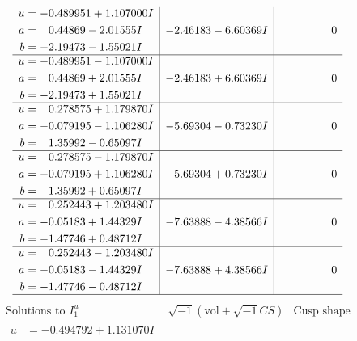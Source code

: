 \documentclass[1p]{elsarticle_modified}
\theoremstyle{definition}
\newcommand{\I}{\sqrt{-1}}
\begin{document}
$$\begin{array}{c|c|c}
\begin{aligned}
u &= -0.489951 + 1.107000 I \\
a &= \phantom{-}0.44869 - 2.01555 I \\
b &= -2.19473 - 1.55021 I\end{aligned}
 & -2.46183 - 6.60369 I & \phantom{-0.000000 } 0 \\ \hline\begin{aligned}
u &= -0.489951 - 1.107000 I \\
a &= \phantom{-}0.44869 + 2.01555 I \\
b &= -2.19473 + 1.55021 I\end{aligned}
 & -2.46183 + 6.60369 I & \phantom{-0.000000 } 0 \\ \hline\begin{aligned}
u &= \phantom{-}0.278575 + 1.179870 I \\
a &= -0.079195 - 1.106280 I \\
b &= \phantom{-}1.35992 - 0.65097 I\end{aligned}
 & -5.69304 - 0.73230 I & \phantom{-0.000000 } 0 \\ \hline\begin{aligned}
u &= \phantom{-}0.278575 - 1.179870 I \\
a &= -0.079195 + 1.106280 I \\
b &= \phantom{-}1.35992 + 0.65097 I\end{aligned}
 & -5.69304 + 0.73230 I & \phantom{-0.000000 } 0 \\ \hline\begin{aligned}
u &= \phantom{-}0.252443 + 1.203480 I \\
a &= -0.05183 + 1.44329 I \\
b &= -1.47746 + 0.48712 I\end{aligned}
 & -7.63888 - 4.38566 I & \phantom{-0.000000 } 0 \\ \hline\begin{aligned}
u &= \phantom{-}0.252443 - 1.203480 I \\
a &= -0.05183 - 1.44329 I \\
b &= -1.47746 - 0.48712 I\end{aligned}
 & -7.63888 + 4.38566 I & \phantom{-0.000000 } 0\\
 \hline 
 \end{array}$$\newpage$$\begin{array}{c|c|c}  
\text{Solutions to }I^u_{1}& \I (\text{vol} + \sqrt{-1}CS) & \text{Cusp shape}\\
 \hline 
\begin{aligned}
u &= -0.494792 + 1.131070 I \\

\end{aligned}
\end{array}$$
\end{document}
